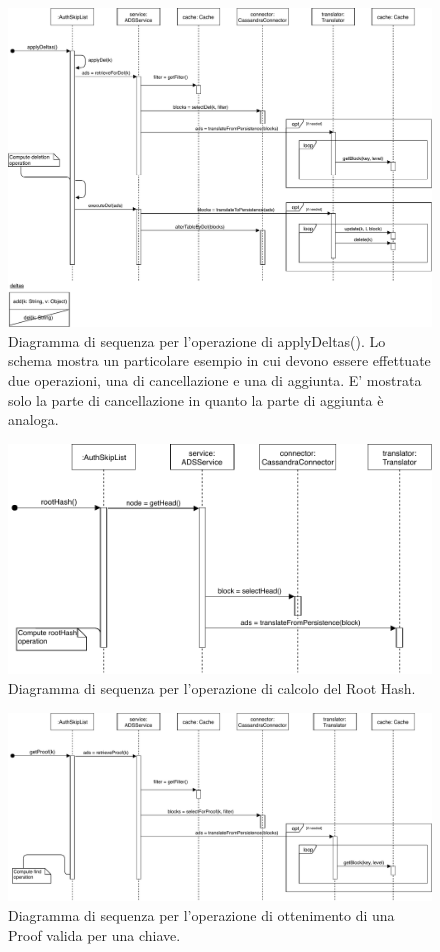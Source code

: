 	\begin{figure}
		\centering
		\includegraphics[scale=0.6]{figure/applyDeltasSD.pdf}
		\caption{Diagramma di sequenza per l'operazione di applyDeltas(). Lo schema mostra un particolare esempio in cui devono essere effettuate due operazioni, una di cancellazione e una di aggiunta. E' mostrata solo la parte di cancellazione in quanto la parte di aggiunta è analoga.}\label{fig:applyDeltasSD}
	\end{figure}

	\begin{figure}
		\centering
		\includegraphics[scale=0.6]{figure/rootHashSD.pdf}
		\caption{Diagramma di sequenza per l'operazione di calcolo del Root Hash.}\label{fig:rootHashSD}
	\end{figure}

	\begin{figure}
		\centering
		\includegraphics[scale=0.6]{figure/getProofSD.pdf}
		\caption{Diagramma di sequenza per l'operazione di ottenimento di una Proof valida per una chiave.}\label{fig:getProofSD}
	\end{figure}




